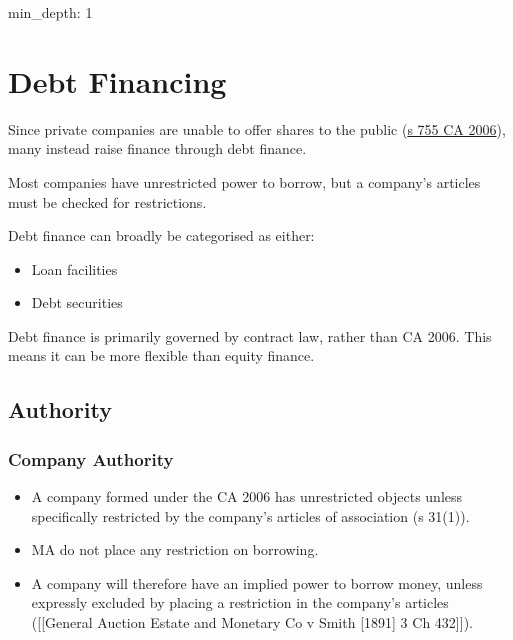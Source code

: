 \documentclass[
]{article}
\author{}
\date{}
\newenvironment{Shaded}{}{}
\newcommand{\NormalTok}[1]{#1}
\providecommand{\tightlist}{%
  \setlength{\itemsep}{0pt}\setlength{\parskip}{0pt}}
\begin{document}
{
\setcounter{tocdepth}{3}
\tableofcontents
}
\begin{Shaded}
\begin{Highlighting}[]
\NormalTok{min\_depth: 1}
\end{Highlighting}
\end{Shaded}

\hypertarget{debt-financing}{%
\section{Debt Financing}\label{debt-financing}}

Since private companies are unable to offer shares to the public
(\href{https://www.legislation.gov.uk/ukpga/2006/46/section/755}{s 755
CA 2006}), many instead raise finance through debt finance.

Most companies have unrestricted power to borrow, but a company's
articles must be checked for restrictions.

Debt finance can broadly be categorised as either:

\begin{itemize}
\tightlist
\item
  Loan facilities
\item
  Debt securities
\end{itemize}

\begin{Shaded}
\begin{Highlighting}[]
\NormalTok{Debt finance is primarily governed by contract law, rather than CA 2006. This means it can be more flexible than equity finance. }
\end{Highlighting}
\end{Shaded}

\hypertarget{authority}{%
\subsection{Authority}\label{authority}}

\hypertarget{company-authority}{%
\subsubsection{Company Authority}\label{company-authority}}

\begin{itemize}
\tightlist
\item
  A company formed under the CA 2006 has unrestricted objects unless
  specifically restricted by the company's articles of association (s
  31(1)).
\item
  MA do not place any restriction on borrowing.
\item
  A company will therefore have an implied power to borrow money, unless
  expressly excluded by placing a restriction in the company's articles
  ({[}{[}General Auction Estate and Monetary Co v Smith {[}1891{]} 3 Ch
  432{]}{]}).
\end{itemize}
\end{document}
